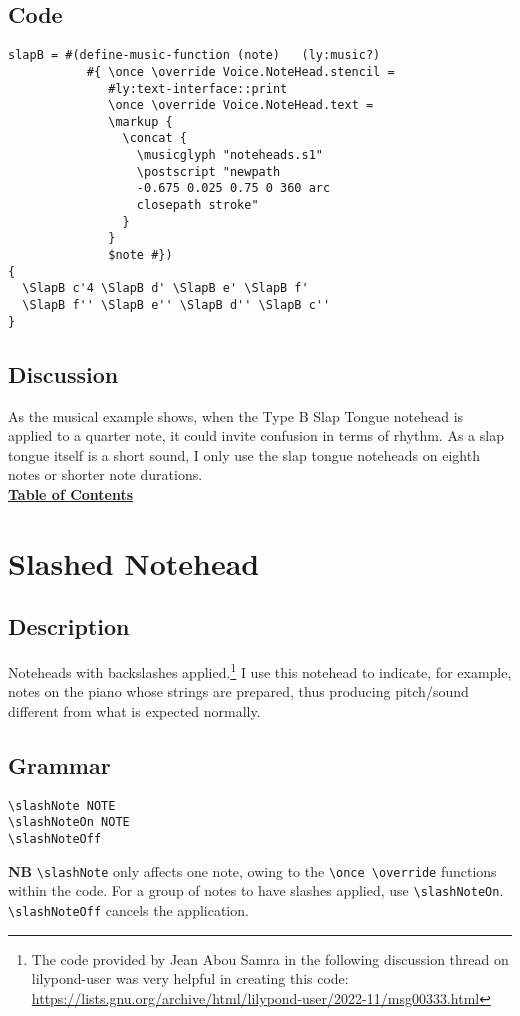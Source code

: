 \subsection{Code}
\begin{verbatim}
slapB = #(define-music-function (note)   (ly:music?)
           #{ \once \override Voice.NoteHead.stencil =
              #ly:text-interface::print
              \once \override Voice.NoteHead.text =
              \markup {
                \concat {
                  \musicglyph "noteheads.s1"
                  \postscript "newpath 
                  -0.675 0.025 0.75 0 360 arc 
                  closepath stroke"
                }
              }
              $note #})
{
  \SlapB c'4 \SlapB d' \SlapB e' \SlapB f'
  \SlapB f'' \SlapB e'' \SlapB d'' \SlapB c''
}

\end{verbatim}
\subsection{Discussion}
As the musical example shows, when the Type B Slap Tongue notehead is applied to a quarter note, it could invite confusion in terms of rhythm. As a slap tongue itself is a short sound, I only use the slap tongue noteheads on eighth notes or shorter note durations. 
\hyperref[sec:toc]{\\ \textbf{Table of Contents}}

\vfill \break


\section {Slashed Notehead}
\hfill
\subsection{Description}
Noteheads with backslashes applied.\footnote{The code provided by Jean Abou Samra in the following discussion thread on lilypond-user was very helpful in creating this code: \url{https://lists.gnu.org/archive/html/lilypond-user/2022-11/msg00333.html}} I use this notehead to indicate, for example, notes on the piano whose strings are prepared, thus producing pitch/sound different from what is expected normally. 

\subsection{Grammar}
\begin{verbatim}
\slashNote NOTE
\slashNoteOn NOTE
\slashNoteOff 
\end{verbatim}
\textbf{NB} \verb|\slashNote| only affects one note, owing to the \verb|\once \override| functions within the code. For a group of notes to have slashes applied, use \verb|\slashNoteOn|. \verb|\slashNoteOff| cancels the application.
